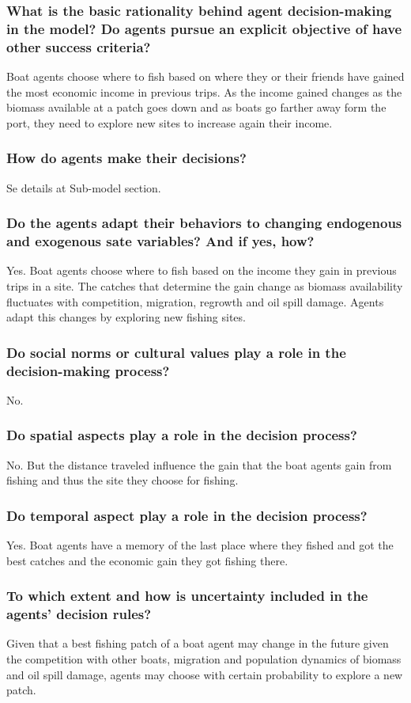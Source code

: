 \documentclass[11pt]{article}
\begin{document}
\subsubsection{What is the basic rationality behind agent decision-making in the model? Do agents pursue an explicit objective of have other success criteria?}
\label{sec:org5fbb1b7}
Boat agents choose where to fish based on where they or their friends have gained the most economic income in previous trips. As the income gained changes as the biomass available at a patch goes down and as boats go farther away form the port, they need to explore new sites to increase again their income. 
\subsubsection{How do agents make their decisions?}
\label{sec:org351de93}
Se details at Sub-model section.
\subsubsection{Do the agents adapt their behaviors to changing endogenous and exogenous sate variables? And if yes, how?}
\label{sec:org04cde92}
Yes. Boat agents choose where to fish based on the income they gain in previous trips in a site. The catches that determine the gain change as biomass availability fluctuates with competition, migration, regrowth and oil spill damage. Agents adapt this changes by exploring new fishing sites.
\subsubsection{Do social norms or cultural values play a role in the decision-making process?}
\label{sec:org7dcf0ae}
No.
\subsubsection{Do spatial aspects play a role in the decision process?}
\label{sec:org6a43e8b}
No. But the distance traveled influence the gain that the boat agents gain from fishing and thus the site they choose for fishing.
\subsubsection{Do temporal aspect play a role in the decision process?}
\label{sec:orgfbce6e8}
Yes. Boat agents have a memory of the last place where they fished and got the best catches and the economic gain they got fishing there. 
\subsubsection{To which extent and how is uncertainty included in the agents' decision rules?}
\label{sec:org1876e3e}
Given that a best fishing patch of a boat agent may change in the future given the competition with other boats, migration and population dynamics of biomass and oil spill damage, agents may choose with certain probability to explore a new patch.
\end{document}
